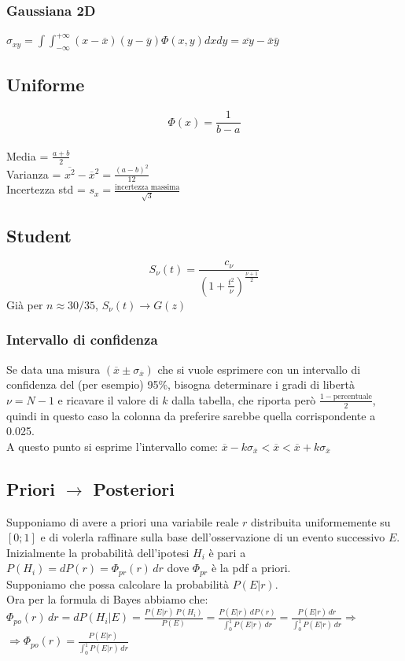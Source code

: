 \documentclass[11pt]{article}
\begin{document}
    \subsubsection{Gaussiana 2D}
    $ \sigma_{xy} =
    \int \int_{-\infty}^{+\infty} ( x - \overline{x} ) ( y - \overline{y} ) \Phi(x,y) dx dy = \overline{xy} - \bar{x} \bar{y} $

    \subsection{Uniforme}
    \[ \Phi(x) = \frac{1}{b - a} \] \\
    Media = $ \frac{a + b}{2} $ \\
    Varianza = $ \overline{x^2} - \overline{x}^2 = \frac{(a-b)^2}{12} $ \\
    Incertezza std = $s_x = \frac{\text{incertezza massima}}{\sqrt {3}} $

    \subsection{Student}
    \[ S_\nu(t) = \frac{c_\nu}{\left( 1 + \frac{t^2}{\nu} \right)^{\frac{\nu + 1}{2}}} \]
    Già per $n \approx 30/35 $, $ S_\nu(t) \rightarrow G(z) $

    \subsubsection{Intervallo di confidenza}
    Se data una misura $ \left( \overline{x} \pm \sigma_{\overline{x}} \right) $ che si vuole esprimere con un intervallo
    di confidenza del (per esempio) 95\%, bisogna determinare i gradi di libertà $\nu = N - 1 $ e ricavare il valore di
    $k$ dalla tabella, che riporta però $ \frac{1 - \text{percentuale}}{2} $, quindi in questo caso la colonna da
    preferire sarebbe quella corrispondente a 0.025. \\
    A questo punto si esprime l'intervallo come:
    $ \overline{x} - k \sigma_{\overline{x}} < \overline{x} < \overline{x} + k \sigma_{\overline{x}} $

    \subsection{Priori $\longrightarrow$ Posteriori}
    Supponiamo di avere a priori una variabile reale $r$ distribuita uniformemente su $[0;1]$ e di volerla raffinare
    sulla base dell'osservazione di un evento successivo $E$. \\
    Inizialmente la probabilità dell'ipotesi $H_i$ è pari a $P(H_i) = dP(r) = \Phi_{pr} (r) \, dr$ dove $\Phi_{pr}$ è la pdf a priori. \\
    Supponiamo che possa calcolare la probabilità $P(E|r)$. \\
    Ora per la formula di Bayes abbiamo che: $\Phi_{po}(r) \, dr = dP(H_i|E) = \frac{P(E|r) \, P(H_i)}{P(E)} =
    \frac{P(E|r) \, dP(r)}{\int_{0}^{1} P(E|r) \, dr} = \frac{P(E|r) \, dr}{\int_{0}^{1} P(E|r) \, dr} \Rightarrow $ \\
    $ \Rightarrow \Phi_{po}(r) = \frac{P(E|r)}{\int_{0}^{1} P(E|r) \, dr} $
\end{document}
